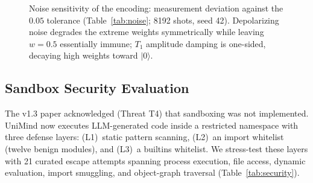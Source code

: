 ﻿\documentclass[12pt,a4paper]{article}
\begin{document}
\begin{figure}[H]
\centering
{}
\caption{Noise sensitivity of the encoding: measurement deviation against the $0.05$ tolerance (Table~\ref{tab:noise}; 8192 shots, seed 42). Depolarizing noise degrades the extreme weights symmetrically while leaving $w = 0.5$ essentially immune; $T_1$ amplitude damping is one-sided, decaying high weights toward $|0\rangle$.}
\label{fig:noise}
\end{figure}

\subsection{Sandbox Security Evaluation}\label{sec:security}

The v1.3 paper acknowledged (Threat T4) that sandboxing was not implemented. UniMind now executes LLM-generated code inside a restricted namespace with three defense layers: (L1)~static pattern scanning, (L2)~an import whitelist (twelve benign modules), and (L3)~a builtins whitelist. We stress-test these layers with 21 curated escape attempts spanning process execution, file access, dynamic evaluation, import smuggling, and object-graph traversal (Table~\ref{tab:security}).
\end{document}
